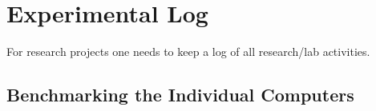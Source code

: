 

\chapter{Experimental Log}

For research projects one needs to keep a log of all research/lab activities.



\section{Benchmarking the Individual Computers}

